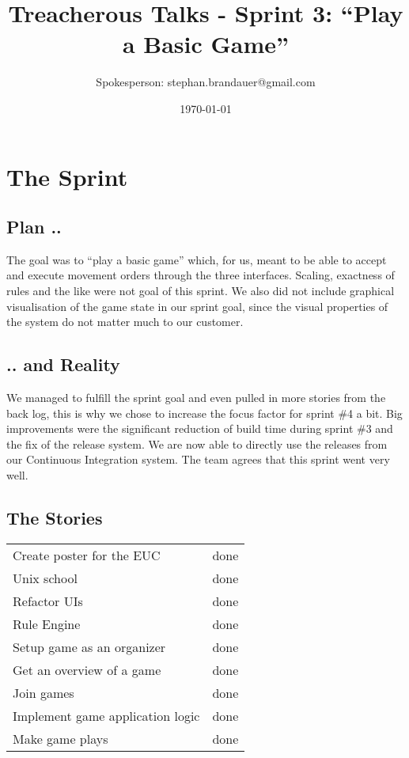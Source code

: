 \documentclass[11pt,a4paper]{article}
\begin{document}
\title{Treacherous Talks -
  Sprint 3: ``Play a Basic Game''}
\date{\today}
\author{Spokesperson: stephan.brandauer@gmail.com}
\maketitle

\section{The Sprint}
\subsection{Plan ..}
The goal was to ``play a basic game'' which, for us, meant to be able to accept
and execute movement orders through the three interfaces. Scaling, exactness of
rules and the like were not goal of this sprint. We also did not include
graphical visualisation of the game state in our sprint goal, since the visual
properties of the system do not matter much to our customer.

\subsection{.. and Reality}
We managed to fulfill the sprint goal and even pulled in more stories from
the back log, this is why we chose to increase the focus factor for sprint \#4 a
bit. Big improvements were the significant reduction of build time during 
sprint \#3 and the fix of the release system. We are now able to directly use
the releases from our Continuous Integration system.
The team agrees that this sprint went very well.

\subsection{The Stories}
\begin{tabular}{l|c}
Create poster for the EUC & done \\
Unix school & done \\
Refactor UIs & done \\
Rule Engine & done \\
Setup game as an organizer & done \\
Get an overview of a game & done \\
Join games & done \\
Implement game application logic & done \\
Make game plays & done \\
\end{tabular}
\end{document}
